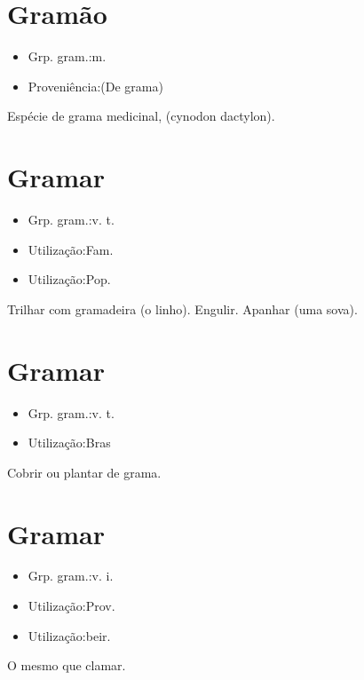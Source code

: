 \section{Gramão}
\begin{itemize}
\item {Grp. gram.:m.}
\end{itemize}
\begin{itemize}
\item {Proveniência:(De \textunderscore grama\textunderscore )}
\end{itemize}
Espécie de grama medicinal, (\textunderscore cynodon dactylon\textunderscore ).
\section{Gramar}
\begin{itemize}
\item {Grp. gram.:v. t.}
\end{itemize}
\begin{itemize}
\item {Utilização:Fam.}
\end{itemize}
\begin{itemize}
\item {Utilização:Pop.}
\end{itemize}
Trilhar com gramadeira (o linho).
Engulir.
Apanhar (uma sova).
\section{Gramar}
\begin{itemize}
\item {Grp. gram.:v. t.}
\end{itemize}
\begin{itemize}
\item {Utilização:Bras}
\end{itemize}
Cobrir ou plantar de grama.
\section{Gramar}
\begin{itemize}
\item {Grp. gram.:v. i.}
\end{itemize}
\begin{itemize}
\item {Utilização:Prov.}
\end{itemize}
\begin{itemize}
\item {Utilização:beir.}
\end{itemize}
O mesmo que \textunderscore clamar\textunderscore .

